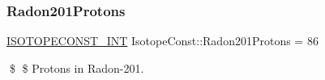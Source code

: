 \subsubsection{\texorpdfstring{Radon201\+Protons}{Radon201Protons}}
{\footnotesize\ttfamily \mbox{\hyperlink{group___isotope_const-_macros_ga5f18360b3e99483a35c32d789e62621c}{I\+S\+O\+T\+O\+P\+E\+C\+O\+N\+S\+T\+\_\+\+I\+NT}} Isotope\+Const\+::\+Radon201\+Protons = 86}

\$ \$ Protons in Radon-\/201. 